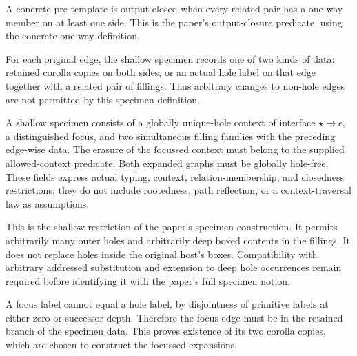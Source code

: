 \begin{definition}\label{term:concrete-output-closure}
A concrete pre-template is output-closed when every related pair has a
one-way member on at least one side. This is the paper's output-closure
predicate, using the concrete one-way definition.
\end{definition}

For each original edge, the shallow specimen records one of two kinds of
data: retained corolla copies on both sides, or an actual hole label on
that edge together with a related pair of fillings. Thus arbitrary changes
to non-hole edges are not permitted by this specimen definition.

\begin{definition}\label{term:shallow-specimen}
A shallow specimen consists of a globally unique-hole context of interface
$\star\to\epsilon$, a distinguished focus, and two simultaneous filling
families with the preceding edge-wise data. The erasure of the focussed
context must belong to the supplied allowed-context predicate. Both expanded
graphs must be globally hole-free. These fields express actual typing,
context, relation-membership, and closedness restrictions; they do not include
rootedness, path reflection, or a context-traversal law as assumptions.
\end{definition}

This is the shallow restriction of the paper's specimen construction. It
permits arbitrarily many outer holes and arbitrarily deep boxed contents in
the fillings. It does not replace holes inside the original host's boxes.
Compatibility with arbitrary addressed substitution and extension to deep
hole occurrences remain required before identifying it with the paper's full
specimen notion.

A focus label cannot equal a hole label, by disjointness of primitive labels
at either zero or successor depth. Therefore the focus edge must be in the
retained branch of the specimen data. This proves existence of its two
corolla copies, which are chosen to construct the focussed expansions.

